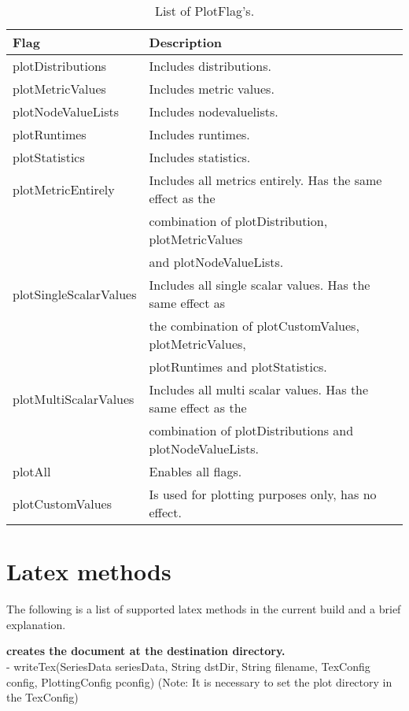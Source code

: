 \begin{table}[h]
\centering
\begin{tabular}[h]{|l|l|}\hline
	\textbf{Flag} & \textbf{Description}\\
	\hline
	plotDistributions & Includes distributions.\\
	\hline
	plotMetricValues & Includes metric values.\\
	\hline
	plotNodeValueLists & Includes nodevaluelists.\\
	\hline
	plotRuntimes & Includes runtimes.\\
	\hline
	plotStatistics & Includes statistics.\\
	\hline
	plotMetricEntirely & Includes all metrics entirely. Has the same effect as the\\
	& combination of plotDistribution, plotMetricValues\\
	& and plotNodeValueLists. \\
	\hline
	plotSingleScalarValues & Includes all single scalar values. Has the same effect as\\
	& the combination of plotCustomValues, plotMetricValues,\\
	& plotRuntimes and plotStatistics.\\
	\hline
	plotMultiScalarValues & Includes all multi scalar values. Has the same effect as the\\
	& combination of plotDistributions and plotNodeValueLists.\\
	\hline
	plotAll & Enables all flags.\\
	\hline
	plotCustomValues & Is used for plotting purposes only, has no effect.\\
	\hline
\end{tabular}
\caption{List of PlotFlag's.}
\label{tab:plot-flags}
\end{table}

\section{Latex methods}
\label{sec:methods}
The following is a list of supported latex methods in the current build and a brief explanation.

\textbf{creates the document at the destination directory.}\\
- writeTex(SeriesData seriesData, String dstDir, String filename, TexConfig config, PlottingConfig pconfig) (Note: It is necessary to set the plot directory in the TexConfig)\\

